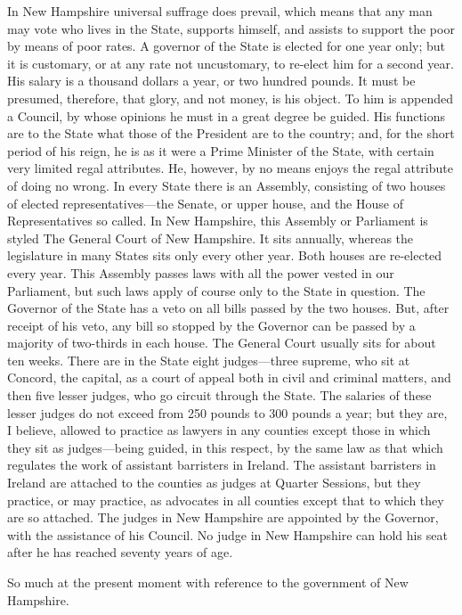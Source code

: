 In New Hampshire universal suffrage does prevail, which means that
any man may vote who lives in the State, supports himself, and
assists to support the poor by means of poor rates.  A governor of
the State is elected for one year only; but it is customary, or at
any rate not uncustomary, to re-elect him for a second year.  His
salary is a thousand dollars a year, or two hundred pounds.  It
must be presumed, therefore, that glory, and not money, is his
object.  To him is appended a Council, by whose opinions he must in
a great degree be guided.  His functions are to the State what
those of the President are to the country; and, for the short
period of his reign, he is as it were a Prime Minister of the
State, with certain very limited regal attributes.  He, however, by
no means enjoys the regal attribute of doing no wrong.  In every
State there is an Assembly, consisting of two houses of elected
representatives---the Senate, or upper house, and the House of
Representatives so called.  In New Hampshire, this Assembly or
Parliament is styled The General Court of New Hampshire.  It sits
annually, whereas the legislature in many States sits only every
other year.  Both houses are re-elected every year.  This Assembly
passes laws with all the power vested in our Parliament, but such
laws apply of course only to the State in question.  The Governor
of the State has a veto on all bills passed by the two houses.
But, after receipt of his veto, any bill so stopped by the Governor
can be passed by a majority of two-thirds in each house.  The
General Court usually sits for about ten weeks.  There are in the
State eight judges---three supreme, who sit at Concord, the capital,
as a court of appeal both in civil and criminal matters, and then
five lesser judges, who go circuit through the State.  The salaries
of these lesser judges do not exceed from 250 pounds to 300 pounds
a year; but they are, I believe, allowed to practice as lawyers in
any counties except those in which they sit as judges---being
guided, in this respect, by the same law as that which regulates
the work of assistant barristers in Ireland.  The assistant
barristers in Ireland are attached to the counties as judges at
Quarter Sessions, but they practice, or may practice, as advocates
in all counties except that to which they are so attached.  The
judges in New Hampshire are appointed by the Governor, with the
assistance of his Council.  No judge in New Hampshire can hold his
seat after he has reached seventy years of age.

So much at the present moment with reference to the government of
New Hampshire.



